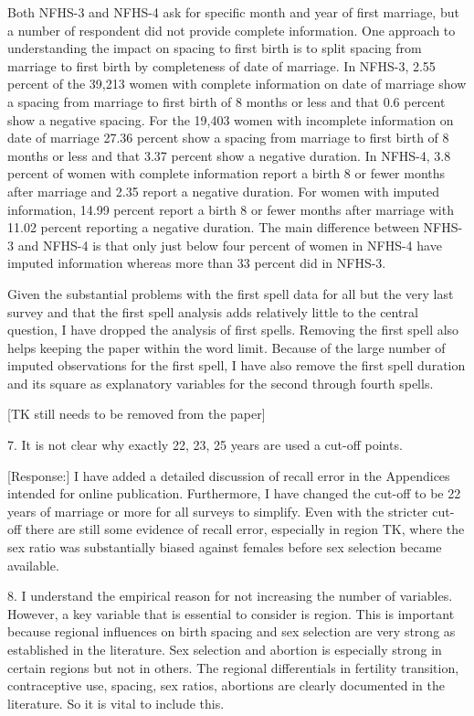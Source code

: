 \documentclass[letterpaper,12pt]{article}
\begin{document}
Both NFHS-3 and NFHS-4 ask for specific month and year of first marriage, but a number of
respondent did not provide complete information.
One approach to understanding the impact on spacing to first birth is to split spacing 
from marriage to first birth by completeness of date of marriage.
In NFHS-3, 2.55 percent of the 39,213 women with complete information on date of 
marriage show a spacing from marriage to first birth of 8 months or less and that 0.6 
percent show a negative spacing. 
For the 19,403 women with incomplete information on date of marriage 27.36 percent show
a spacing from marriage to first birth of 8 months or less and that 3.37 percent show a 
negative duration.
In NFHS-4, 3.8 percent of women with complete information report a birth 8 or fewer months
after marriage and 2.35 report a negative duration.
For women with imputed information, 14.99 percent report a birth 8 or fewer months
after marriage with 11.02 percent reporting a negative duration.
The main difference between NFHS-3 and NFHS-4 is that only just below four percent of 
women in NFHS-4 have imputed information whereas more than 33 percent did in NFHS-3.

Given the substantial problems with the first spell data for all but the very last
survey and that the first spell analysis adds relatively little to the central question, 
I have dropped the analysis of first spells.
Removing the first spell also helps keeping the paper within the word limit.
Because of the large number of imputed observations for the first spell, I have also
remove the first spell duration and its square as explanatory variables for the second
through fourth spells.

[TK still needs to be removed from the paper]


7. It is not clear why exactly 22, 23, 25 years are used a cut-off
points.

[Response:]
I have added a detailed discussion of recall error in the Appendices intended for online 
publication.
Furthermore, I have changed the cut-off to be 22 years of marriage or more for all surveys 
to simplify.
Even with the stricter cut-off there are still some evidence of recall error,
especially in region TK, where the sex ratio was substantially biased against females 
before sex selection became available.


8. I understand the empirical reason for not increasing the number of
variables. However, a key variable that is essential to consider is
region. This is important because regional influences on birth spacing
and sex selection are very strong as established in the literature. Sex
selection and abortion is especially strong in certain regions but not
in others. The regional differentials in fertility transition,
contraceptive use, spacing, sex ratios, abortions are clearly documented
in the literature. So it is vital to include this.
\end{document}
